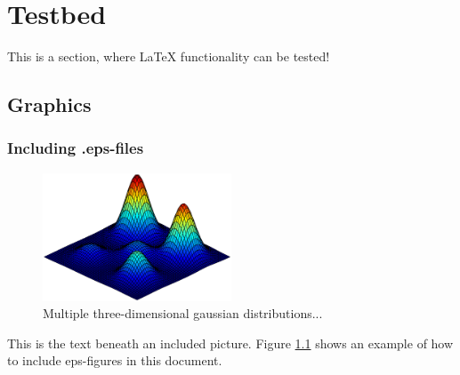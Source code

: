 \chapter[Testbed]{Testbed}
\label{chap:Testbed}
This is a section, where LaTeX functionality can be tested!
\section{Graphics}
\subsection{Including .eps-files}

\begin{figure}[H]
\centering
\includegraphics[width=0.5\textwidth]{data/plots/gmm/gaussian}
\caption{Multiple three-dimensional gaussian distributions...}
\label{fig:mog}
\end{figure}


This is the text beneath an included picture. Figure \ref{fig:mog} shows an example of how to include eps-figures in this document.


